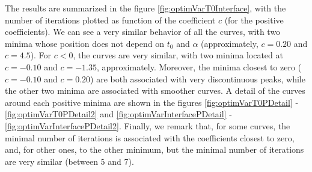 \indent The results are summarized in the figure \ref{fig:optimVarT0Interface}, with the number of iterations plotted as function of the coefficient $c$ (for the positive coefficients). We can see a very similar behavior of all the curves, with two minima whose position does not depend on $t_0$ and $\alpha$ (approximately, $c = 0.20$ and $c=4.5$). For $c<0$, the curves are very similar, with two minima located at $c = -0.10$ and $c = -1.35$, approximately. Moreover, the minima closest to zero ($c=-0.10$ and $c = 0.20$) are both associated with very discontinuous peaks, while the other two minima are associated with smoother curves. A detail of the curves around each positive minima are shown in the figures \ref{fig:optimVarT0PDetail} - \ref{fig:optimVarT0PDetail2} and \ref{fig:optimVarInterfacePDetail} - \ref{fig:optimVarInterfacePDetail2}. Finally, we remark that, for some curves, the minimal number of iterations is associated with the coefficients closest to zero, and, for other ones, to the other minimum, but the minimal number of iterations are very similar (between 5 and 7).

